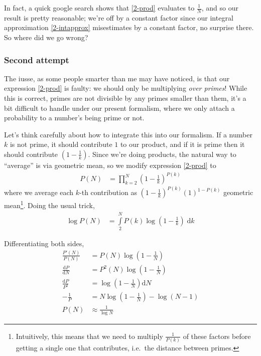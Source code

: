 \documentclass[10pt]{article}
\newcommand{\rd}[2]{\frac{\mathrm{d}#1}{\mathrm{d}#2}}
\begin{document}
In fact, a quick google search shows that \autoref{2-prod} evaluates to
$\frac{1}{N}$, and so our result is pretty reasonable; we're off by a constant
factor since our integral approximation \autoref{2-intapprox} misestimates by a
constant factor, no surprise there. So where did we go wrong?

\subsubsection{Second attempt}

The iusse, as some people smarter than me may have noticed, is that our
expression \autoref{2-prod} is faulty: we should only be multiplying \emph{over
primes}! While this is correct, primes are not divisible by any primes smaller
than them, it's a bit difficult to handle under our present formalism, where we
only attach a probability to a number's being prime or not.

Let's think carefully about how to integrate this into our formalism. If a
number $k$ is not prime, it should contribute $1$ to our product, and if it is
prime then it should contribute $\left( 1 - \frac{1}{k} \right)$. Since we're
doing products, the natural way to ``average'' is via geometric mean, so we
modify expression \autoref{2-prod} to
\begin{align}
    P(N) &= \prod\limits_{k=2}^{N}\left( 1 - \frac{1}{k}
    \right)^{P(k)}\label{2-improved}
\end{align}
where we average each $k$-th contribution as $\left( 1 - \frac{1}{k}
\right)^{P(k)}(1)^{1-P(k)}$ geometric mean\footnote{Intuitively, this means that
we need to multiply $\frac{1}{P(k)}$ of these factors before getting a single
one that contributes, i.e.\ the distance between primes.}. Doing the usual trick,
\begin{align}
    \log P(N) &= \int\limits_{2}^{N}P(k) \log\left( 1 - \frac{1}{k}
    \right)\;\mathrm{d}k
\end{align}

Differentiating both sides,
\begin{align}
    \frac{P'(N)}{P(N)} &= P(N)\log\left( 1 - \frac{1}{N} \right)\\
    \rd{P}{N} &= P^2(N)\log\left( 1 - \frac{1}{N} \right)\\
    \frac{\mathrm{d}P}{P^2} &= \log\left( 1 - \frac{1}{N} \right)\mathrm{d}N\\
    -\frac{1}{P} &= N\log\left( 1 - \frac{1}{N} \right) - \log\left( N - 1
    \right)\\
    P(N) &\approx \frac{1}{\log N}
\end{align}
\end{document}
